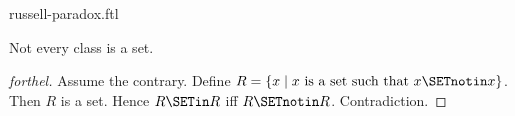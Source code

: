 \documentclass{naproche-library}
\begin{document}
\begin{smodule}[title=Russell's Paradox]{russell-paradox.ftl}

\begin{theorem}[forthel,title=Russell's Paradox,id=russell_paradox]
  Not every class is a set.
\end{theorem}
\begin{proof}[forthel]
  Assume the contrary.
  Define $R = \{x \mid x\text{ is a set such that }x \SETnotin x\}$.
  Then $R$ is a set.
  Hence $R \SETin R$ iff $R \SETnotin R$.
  Contradiction.
\end{proof}
\end{smodule}
\end{document}
